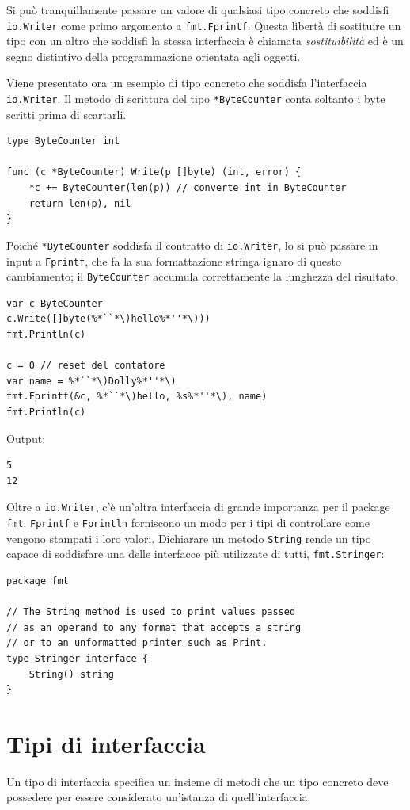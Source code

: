 Si può tranquillamente passare un valore di qualsiasi tipo concreto che soddisfi \verb|io.Writer| come primo argomento a \verb|fmt.Fprintf|.
Questa libertà di sostituire un tipo con un altro che soddisfi la stessa interfaccia è chiamata \textit{sostituibilità} ed è un segno distintivo della programmazione orientata agli oggetti.

Viene presentato ora un esempio di tipo concreto che soddisfa l'interfaccia \verb|io.Writer|.
Il metodo di scrittura del tipo \verb|*ByteCounter| conta soltanto i byte scritti prima di scartarli.
\begin{lstlisting}[frame=single, label={lst:lstlisting6-1.3}]
type ByteCounter int

func (c *ByteCounter) Write(p []byte) (int, error) {
    *c += ByteCounter(len(p)) // converte int in ByteCounter
    return len(p), nil
}
\end{lstlisting}
Poiché \verb|*ByteCounter| soddisfa il contratto di \verb|io.Writer|, lo si può passare in input a \verb|Fprintf|, che fa la sua formattazione stringa ignaro di questo cambiamento;
il \verb|ByteCounter| accumula correttamente la lunghezza del risultato.
\begin{lstlisting}[frame=single, label={lst:lstlisting6-1.4}]
var c ByteCounter
c.Write([]byte(%*``*\)hello%*''*\)))
fmt.Println(c)

c = 0 // reset del contatore
var name = %*``*\)Dolly%*''*\)
fmt.Fprintf(&c, %*``*\)hello, %s%*''*\), name)
fmt.Println(c)
\end{lstlisting}
Output:
\begin{lstlisting}[language=bash, frame=L, label={lst:lstlisting6-1.5}]
5
12
\end{lstlisting}
Oltre a \verb|io.Writer|, c'è un'altra interfaccia di grande importanza per il package \verb|fmt|.
\verb|Fprintf| e \verb|Fprintln| forniscono un modo per i tipi di controllare come vengono stampati i loro valori.
Dichiarare un metodo \verb|String| rende un tipo capace di soddisfare una delle interfacce più utilizzate di tutti, \verb|fmt.Stringer|:
\begin{lstlisting}[frame=single, label={lst:lstlisting6-1.6}]
package fmt

// The String method is used to print values passed
// as an operand to any format that accepts a string
// or to an unformatted printer such as Print.
type Stringer interface {
    String() string
}
\end{lstlisting}


\section{Tipi di interfaccia}
\label{sec:tipi_di_interfaccia}%
Un tipo di interfaccia specifica un insieme di metodi che un tipo concreto deve possedere per essere considerato un'istanza di quell'interfaccia.

